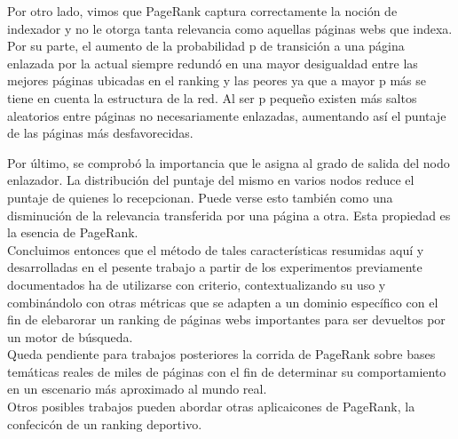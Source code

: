 Por otro lado, vimos que PageRank captura correctamente la noción de indexador y no le otorga tanta relevancia como aquellas páginas webs que indexa. \\
Por su parte, el aumento de la probabilidad p de transición a una página enlazada por la actual siempre redundó en una mayor desigualdad entre las mejores páginas ubicadas en el ranking y las peores ya que a mayor p más se tiene en cuenta la estructura de la red. Al ser p pequeño existen más saltos aleatorios entre páginas no necesariamente enlazadas, aumentando así el puntaje de las páginas más desfavorecidas.

Por último, se comprobó la importancia que le asigna al grado de salida del nodo enlazador. La distribución del puntaje del mismo en varios nodos reduce el puntaje de quienes lo recepcionan. Puede verse esto también como una disminución de la relevancia transferida por una página a otra. Esta propiedad es la esencia de PageRank. \\


Concluimos entonces que el método de tales características resumidas aquí y desarrolladas en el pesente trabajo a partir de los experimentos previamente documentados ha de utilizarse con criterio, contextualizando su uso y combinándolo con otras métricas que se adapten a un dominio específico con el fin de elebarorar un ranking de páginas webs importantes para ser devueltos por un motor de búsqueda.\\

Queda pendiente para trabajos posteriores la corrida de PageRank sobre bases temáticas reales de miles de páginas con el fin de determinar su comportamiento en un escenario más aproximado al mundo real. \\

Otros posibles trabajos pueden abordar otras aplicaicones de PageRank, la confecicón de un ranking deportivo. \\